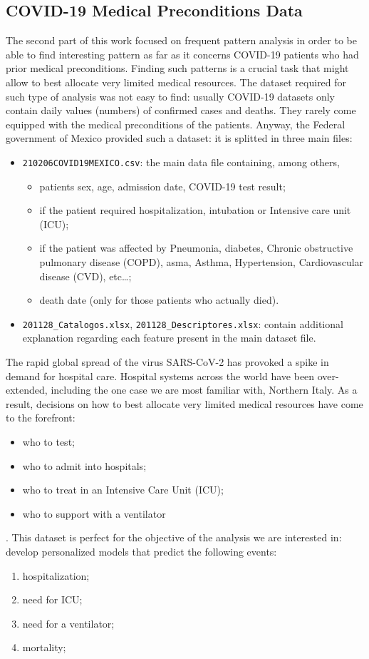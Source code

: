 \documentclass[11pt,a4paper]{article}
\begin{document}
\subsection{COVID-19 Medical Preconditions Data}
The second part of this work focused on frequent pattern analysis in order to be
able to find interesting pattern as far as it concerns COVID-19 patients who
had prior medical preconditions. Finding such patterns is a crucial task that
might allow to best allocate very limited medical resources. The dataset
required for such type of analysis was not easy to find: usually COVID-19
datasets only contain daily values (numbers) of confirmed cases and deaths. They
rarely come equipped with the medical preconditions of the patients. Anyway,
the Federal government of Mexico\cite{mexico} provided such a dataset: it is
splitted in three main files:
\begin{itemize}
    \item \texttt{210206COVID19MEXICO.csv}: the main data file containing, among
    others,
    \begin{itemize}
        \item patients sex, age, admission date, COVID-19 test result;
        \item if the patient required hospitalization, intubation or Intensive
        care unit (ICU);
        \item if the patient was affected by Pneumonia, diabetes, Chronic
        obstructive pulmonary disease (COPD), asma, Asthma, Hypertension,
        Cardiovascular disease (CVD), etc\dots;
        \item death date (only for those patients who actually died).
    \end{itemize}
    \item \texttt{201128\_Catalogos.xlsx}, \texttt{201128\_Descriptores.xlsx}:
    contain additional explanation regarding each feature present in the main
    dataset file.
\end{itemize}
The rapid global spread of the virus SARS-CoV-2 has provoked a spike in
demand for hospital care. Hospital systems across the world have been
over-extended, including the one case we are most familiar with, Northern Italy.
As a result, decisions on how to best allocate very limited medical resources
have come to the forefront:
\begin{itemize}
    \item who to test;
    \item who to admit into hospitals;
    \item who to treat in an Intensive Care Unit (ICU);
    \item who to support with a ventilator
\end{itemize}.
This dataset is perfect for the objective of the analysis we are interested in:
develop personalized models that predict the following events:
\begin{enumerate}
    \item hospitalization;
    \item need for ICU;
    \item need for a ventilator;
    \item mortality;
\end{enumerate}
\end{document}
